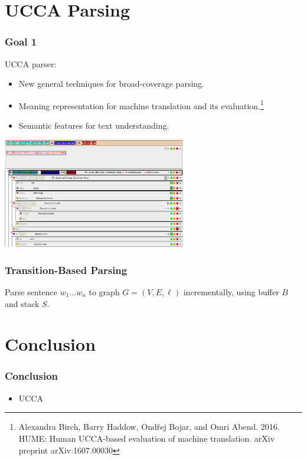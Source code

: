 \documentclass[t]{beamer}
\begin{document}
\section[]{UCCA Parsing}

\begin{frame}
\frametitle{Goal 1}
UCCA parser:
\begin{itemize}
\item New general techniques for broad-coverage parsing.
\item Meaning representation for machine translation and its evaluation.\footnote{
Alexandra Birch, Barry Haddow, Ond\v{r}ej Bojar, and Omri Abend. 2016. HUME: Human UCCA-based
evaluation of machine translation. arXiv preprint arXiv:1607.00030}
\item Semantic features for text understanding.
\end{itemize}
\begin{center}
 \includegraphics[width=0.6\textwidth,keepaspectratio]{hume}
\end{center}
\end{frame}

\begin{frame}
\frametitle{Transition-Based Parsing}
Parse sentence $w_1 \ldots w_n$ to graph $G=(V,E,\ell)$ incrementally, using buffer $B$ and stack $S$.
\end{frame}


\section[]{Conclusion}

\begin{frame}
\frametitle{Conclusion}
\begin{itemize}
 \item UCCA
\end{itemize}
\end{frame}
\end{document}
